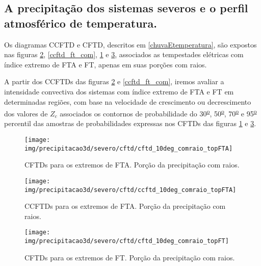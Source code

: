 \subsection{A precipitação dos sistemas severos e o perfil atmosférico de temperatura.}

Os diagramas CCFTD e CFTD, descritos em \ref{chuvaEtemperatura}, são expostos nas figuras \ref{ccftd_fta_com}, \ref{ccftd_ft_com}, \ref{cftd_fta_com} e \ref{cftd_ft_com}, associados as tempestades elétricas com índice extremo de FTA e FT, apenas em suas porções com raios.

A partir dos CCFTDs das figuras \ref{ccftd_fta_com} e \ref{ccftd_ft_com}, iremos avaliar a intensidade convectiva dos sistemas com índice extremo de FTA e FT em determinadas regiões, com base na velocidade de crescimento ou decrescimento dos valores de $Z_{c}$ associados os contornos de probabilidade do 30\textsuperscript{\underline{o}}, 50\textsuperscript{\underline{o}}, 70\textsuperscript{\underline{o}} e 95\textsuperscript{\underline{o}} percentil das amostras de probabilidades expressas nos CFTDs das figuras \ref{cftd_fta_com} e \ref{cftd_ft_com}.	

\begin{figure}[!ht]
  \centering
  \texttt{[image: img/precipitacao3d/severo/cftd/cftd\_10deg\_comraio\_topFTA]}
 \caption{CFTDs para os extremos de FTA. Porção da precipitação com raios.}
 \label{cftd_fta_com}
\end{figure} 

\begin{figure}[!ht]
  \centering
  \texttt{[image: img/precipitacao3d/severo/cftd/ccftd\_10deg\_comraio\_topFTA]}
  \caption{CCFTDs para os extremos de FTA. Porção da precipitação com raios.}
  \label{ccftd_fta_com}   
\end{figure} 

 

\begin{figure}[!ht]
  \centering
  \texttt{[image: img/precipitacao3d/severo/cftd/cftd\_10deg\_comraio\_topFT]}
 \caption{CFTDs para os extremos de FT. Porção da precipitação com raios.}
 \label{cftd_ft_com}
\end{figure} 

